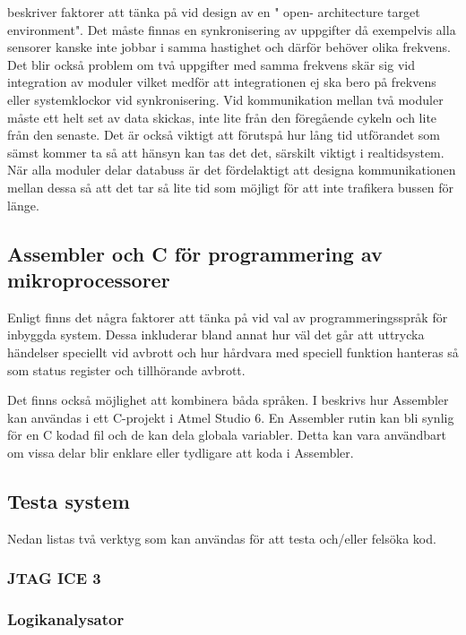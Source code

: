 \documentclass[11pt]{article}
\begin{document}
\begin{flushleft}
\cite{IRS} beskriver faktorer att tänka på vid design av en " open- architecture target environment". Det måste finnas en synkronisering av uppgifter då exempelvis alla sensorer kanske inte jobbar i samma hastighet och därför behöver olika frekvens. Det blir också problem om två uppgifter med samma frekvens skär sig vid integration av moduler vilket medför att integrationen ej ska bero på frekvens eller systemklockor vid synkronisering. Vid kommunikation mellan två moduler måste ett  helt set av data skickas, inte lite från den föregående cykeln och lite från den senaste. Det är också viktigt att förutspå hur lång tid utförandet som sämst kommer ta så att hänsyn kan tas det det, särskilt viktigt i realtidsystem. När alla moduler delar databuss är det fördelaktigt att designa kommunikationen mellan dessa så att det tar så lite tid som möjligt för att inte trafikera bussen för länge.   

\subsection{Assembler och C för programmering av mikroprocessorer}

Enligt \cite{CPC} finns det några faktorer att tänka på vid val av programmeringsspråk för inbyggda system. Dessa inkluderar bland annat hur väl det går att uttrycka händelser speciellt vid avbrott och hur hårdvara med speciell funktion hanteras så som status register och tillhörande avbrott.  

Det finns också möjlighet att kombinera båda språken. I \cite{AssC} beskrivs hur Assembler kan användas i ett C-projekt i Atmel Studio 6. En Assembler rutin kan bli synlig för en C kodad fil och de kan dela globala variabler. Detta kan vara användbart om vissa delar blir enklare eller tydligare att koda i Assembler.

\subsection{Testa system} 

Nedan listas två verktyg som kan användas för att testa och/eller felsöka kod.

\subsubsection{JTAG ICE 3}


\subsubsection{Logikanalysator}


\end{flushleft}
\end{document}
